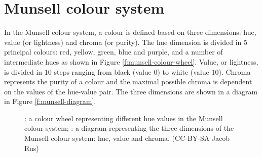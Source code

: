 \section{Munsell colour system}
\label{s:munsell}

In the Munsell colour system, a colour is defined based on three
dimensions: hue, value (or lightness) and chroma (or purity). The hue
dimension is divided in 5 principal colours: red, yellow, green, blue
and purple, and a number of intermediate hues as shown in Figure
\ref{f:munsell-colour-wheel}. Value, or lightness, is divided in 10
steps ranging from black (value 0) to white (value 10). Chroma
represents the purity of a colour and the maximal possible chroma is
dependent on the values of the hue-value pair. The three dimensions
are shown in a diagram in Figure \ref{f:munsell-diagram}.

\begin{figure}[htbp]
\centering
{}
\caption[The Munsell colour system]{: a colour wheel representing different hue values in the Munsell colour system; : a diagram representing the three dimensions of the Munsell colour system: hue, value and chroma. (CC-BY-SA Jacob Rus)}
\end{figure}

